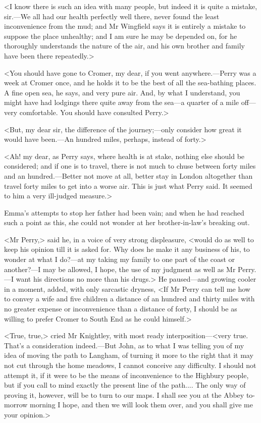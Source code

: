 <I know there is such an idea with many people, but indeed it is quite a mistake, sir.—We all had our health perfectly well there, never found the least inconvenience from the mud; and Mr Wingfield says it is entirely a mistake to suppose the place unhealthy; and I am sure he may be depended on, for he thoroughly understands the nature of the air, and his own brother and family have been there repeatedly.>

<You should have gone to Cromer, my dear, if you went anywhere.—Perry was a week at Cromer once, and he holds it to be the best of all the sea-bathing places. A fine open sea, he says, and very pure air. And, by what I understand, you might have had lodgings there quite away from the sea—a quarter of a mile off—very comfortable. You should have consulted Perry.>

<But, my dear sir, the difference of the journey;—only consider how great it would have been.—An hundred miles, perhaps, instead of forty.>

<Ah! my dear, as Perry says, where health is at stake, nothing else should be considered; and if one is to travel, there is not much to chuse between forty miles and an hundred.—Better not move at all, better stay in London altogether than travel forty miles to get into a worse air. This is just what Perry said. It seemed to him a very ill-judged measure.>

Emma's attempts to stop her father had been vain; and when he had reached such a point as this, she could not wonder at her brother-in-law's breaking out.

<Mr Perry,> said he, in a voice of very strong displeasure, <would do as well to keep his opinion till it is asked for. Why does he make it any business of his, to wonder at what I do?—at my taking my family to one part of the coast or another?—I may be allowed, I hope, the use of my judgment as well as Mr Perry.—I want his directions no more than his drugs.> He paused—and growing cooler in a moment, added, with only sarcastic dryness, <If Mr Perry can tell me how to convey a wife and five children a distance of an hundred and thirty miles with no greater expense or inconvenience than a distance of forty, I should be as willing to prefer Cromer to South End as he could himself.>

<True, true,> cried Mr Knightley, with most ready interposition—<very true. That's a consideration indeed.—But John, as to what I was telling you of my idea of moving the path to Langham, of turning it more to the right that it may not cut through the home meadows, I cannot conceive any difficulty. I should not attempt it, if it were to be the means of inconvenience to the Highbury people, but if you call to mind exactly the present line of the path.... The only way of proving it, however, will be to turn to our maps. I shall see you at the Abbey to-morrow morning I hope, and then we will look them over, and you shall give me your opinion.>

